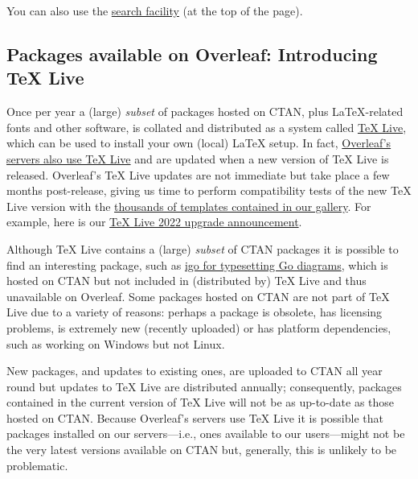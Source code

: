 You can also use the \href{https://www.ctan.org/pkg}{search facility} (at the top of the page).

\subsection{Packages available on Overleaf: Introducing TeX Live}

Once per year a (large) \emph{subset} of packages hosted on CTAN, plus \LaTeX-related fonts and other software, is collated and distributed as a system called \href{https://tug.org/texlive/}{TeX Live}, which can be used to install your own (local) LaTeX setup. In fact, \href{https://www.overleaf.com/learn/latex/Overleaf_and_TeX_Live}{Overleaf’s servers also use TeX Live} and are updated when a new version of TeX Live is released. Overleaf’s TeX Live updates are not immediate but take place a few months post-release, giving us time to perform compatibility tests of the new TeX Live version with the \href{https://www.overleaf.com/gallery}{thousands of templates contained in our gallery}. For example, here is our \href{https://www.overleaf.com/blog/tex-live-2022-now-available}{TeX Live 2022 upgrade announcement}.

Although TeX Live contains a (large) \emph{subset} of CTAN packages it is possible to find an interesting package, such as \href{https://ctan.org/pkg/igo?lang=en}{igo for typesetting Go diagrams}, which is hosted on CTAN but not included in (distributed by) TeX Live and thus unavailable on Overleaf. Some packages hosted on CTAN are not part of TeX Live due to a variety of reasons: perhaps a package is obsolete, has licensing problems, is extremely new (recently uploaded) or has platform dependencies, such as working on Windows but not Linux.

New packages, and updates to existing ones, are uploaded to CTAN all year round but updates to TeX Live are distributed annually; consequently, packages contained in the current version of TeX Live will not be as up-to-date as those hosted on CTAN. Because Overleaf’s servers use TeX Live it is possible that packages installed on our servers—i.e., ones available to our users—might not be the very latest versions available on CTAN but, generally, this is unlikely to be problematic.